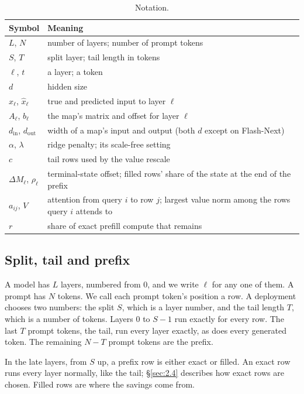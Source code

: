 \documentclass[11pt]{article}
\begin{document}
\begin{table}[!htbp]
\centering
\caption{Notation.}\label{tab:2}
\small
\setlength{\tabcolsep}{4pt}
\begin{tabularx}{\linewidth}{l>{\raggedright\arraybackslash\hsize=1.000\hsize}X}
\toprule
Symbol & Meaning \\
\midrule
$L$, $N$ & number of layers; number of prompt tokens \\
$S$, $T$ & split layer; tail length in tokens \\
$\ell$, $t$ & a layer; a token \\
$d$ & hidden size \\
$x_\ell$, $\hat{x}_\ell$ & true and predicted input to layer $\ell$ \\
$A_\ell$, $b_\ell$ & the map's matrix and offset for layer $\ell$ \\
$d_\text{in}$, $d_\text{out}$ & width of a map's input and output (both $d$ except on Flash-Next) \\
$\alpha$, $\lambda$ & ridge penalty; its scale-free setting \\
$c$ & tail rows used by the value rescale \\
$\Delta M_\ell$, $\rho_\ell$ & terminal-state offset; filled rows' share of the state at the end of the prefix \\
$a_{ij}$, $V$ & attention from query $i$ to row $j$; largest value norm among the rows query $i$ attends to \\
$r$ & share of exact prefill compute that remains \\
\bottomrule
\end{tabularx}
\end{table}


\subsection{Split, tail and prefix}\label{sec:2.1}
A model has $L$ layers, numbered from 0, and we write $\ell$ for any one of them. A prompt has $N$ tokens. We call each prompt token's position a row. A deployment chooses two numbers: the split $S$, which is a layer number, and the tail length $T$, which is a number of tokens. Layers $0$ to $S-1$ run exactly for every row. The last $T$ prompt tokens, the tail, run every layer exactly, as does every generated token. The remaining $N - T$ prompt tokens are the prefix.

In the late layers, from $S$ up, a prefix row is either exact or filled. An exact row runs every layer normally, like the tail; \S\ref{sec:2.4} describes how exact rows are chosen. Filled rows are where the savings come from.
\end{document}
